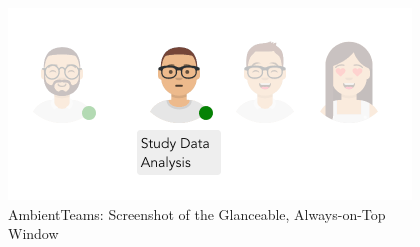 \begin{figure}[h]
    \centering
    \includegraphics[width=.5\linewidth]{./images/AT_ambient_intro.png}
    \caption{AmbientTeams: Screenshot of the Glanceable, Always-on-Top Window}
    \label{fig:at_ambient_intro}
\end{figure}




